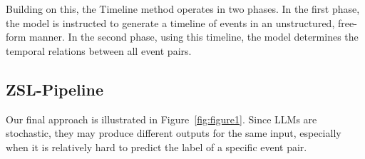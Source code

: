 Building on this, the Timeline method operates in two phases. In the first phase, the model is instructed to generate a timeline of events in an unstructured, free-form manner. In the second phase, using this timeline, the model determines the temporal relations between all event pairs.



\subsection{ZSL-Pipeline}
\label{section:model:pipeline}


Our final approach is illustrated in Figure~\ref{fig:figure1}. Since LLMs are stochastic, they may produce different outputs for the same input, especially when it is relatively hard to predict the label of a specific event pair.  


